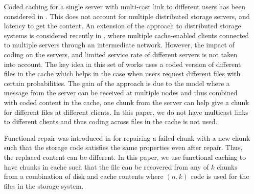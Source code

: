 Coded caching for a single server with multi-cast link to different users has been considered in \cite{DBLP:journals/corr/NiesenM14,6875212,6763007,6849235}. This does not account for multiple distributed storage servers, and latency to get the content. An extension of the approach to distributed storage systems is considered recently in \cite{DBLP:journals/corr/ShariatpanahiMK15}, where  multiple cache-enabled clients connected to multiple servers through an intermediate network. However, the impact of coding on the servers, and limited service rate of different servers is not taken into account. The key idea in this set of works uses a coded version of different files in the cache which helps in the case when users request different files with certain probabilities. The gain of the approach is due to the model where a message from the server can be received at multiple nodes and thus combined with coded content in the cache, one chunk from the server can help give a chunk for different files at different clients. In this paper, we do not have multicast links to different clients and thus coding across files in the cache is not used. 

Functional repair was introduced in \cite{Dimakis:10} for repairing a failed chunk with a new chunk such that the storage code satisfies the same properties even after repair. Thus, the replaced content can be different. In this paper, we use functional caching to have chunks in cache such that the file can be recovered from any of $k$ chunks from a combination of disk and cache contents where $(n,k)$ code is used for the files in the storage system. 